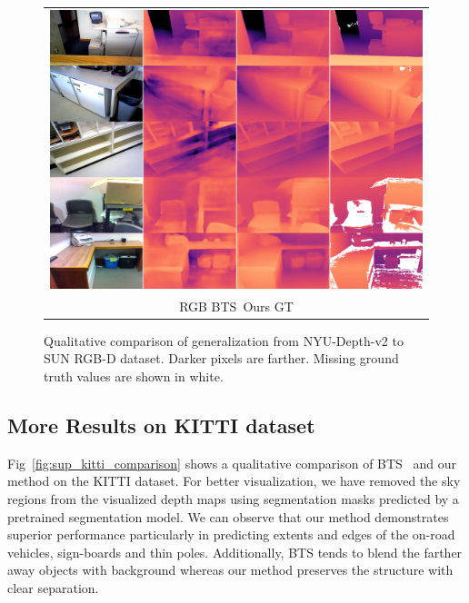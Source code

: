 \documentclass[final]{cvpr}
\begin{document}
\begin{figure}[t]
    \centering
    \begin{tabular}{c}
         \includegraphics[width=0.85\linewidth]{sunrgb-comparison.png} \\
         \hspace{0.0\linewidth}RGB \hspace{0.15\linewidth}BTS~\cite{bts_lee2019big}\hspace{0.14\linewidth}Ours \hspace{0.17\linewidth}GT\\
    \end{tabular}
    
    \caption{Qualitative comparison of generalization from NYU-Depth-v2 to SUN RGB-D dataset. 
    Darker pixels are farther. Missing ground truth values are shown in white.}
    \label{fig:sup_sun_rgbd_comparison}
\end{figure}

\subsection{More Results on KITTI dataset}
Fig~\ref{fig:sup_kitti_comparison} shows a qualitative comparison of BTS~\cite{bts_lee2019big} and our method on the KITTI dataset. For better visualization, we have removed the sky regions from the visualized depth maps using segmentation masks predicted by a pretrained segmentation model\cite{deeplabv3plus2018}. We can observe that our method demonstrates superior performance particularly in predicting extents and edges of the on-road vehicles, sign-boards and thin poles. Additionally, BTS tends to blend the farther away objects with background whereas our method preserves the structure with clear separation.
\end{document}
